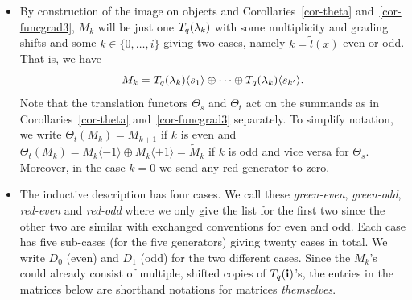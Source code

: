 \begin{defn}
\begin{itemize}
 
 
\item By construction of the image on objects 
and Corollaries~\ref{cor-theta} and~\ref{cor-funcgrad3}, 
$M_k$ will be just one $T_q({\lambda_k})$ with 
some multiplicity and grading shifts and some 
$k\in\{0,\dots,i\}$ giving two cases, namely 
$k=\tilde{l}(x)$ even or odd. That is, we have
\[
M_k=T_q({\lambda_k})\langle s_1\rangle\oplus \cdots\oplus T_q({\lambda_k})\langle s_{k^{\prime}}\rangle.
\]
Note that the translation functors $\Theta_s$ 
and $\Theta_t$ act on the summands as in 
Corollaries~\ref{cor-theta} and~\ref{cor-funcgrad3} 
separately. To simplify notation, we write 
$\Theta_t(M_k)=M_{k+1}$ if $k$ is even and 
$\Theta_t(M_k)=M_{k}\langle-1\rangle\oplus M_{k}\langle+1\rangle=\tilde{M}_k$ 
if $k$ is odd and vice versa for $\Theta_s$. Moreover, 
in the case $k=0$ we send any red generator to zero.



\item The inductive description has four cases. 
We call these \textit{green-even}, \textit{green-odd}, 
\textit{red-even} and \textit{red-odd} where we only 
give the list for the first two since the other two 
are similar with exchanged conventions for even and 
odd. Each case has five sub-cases (for the five generators) 
giving twenty cases in total. We write $D_{0}$ (even) and 
$D_{1}$ (odd) for the two different cases. 
Since the $M_k$'s could already consist of multiple, shifted 
copies of $T_q({\boldsymbol{\mathrm{i}}})$'s, the entries in the matrices below 
are shorthand notations for matrices \textit{themselves}.





\end{itemize}
\end{defn}
